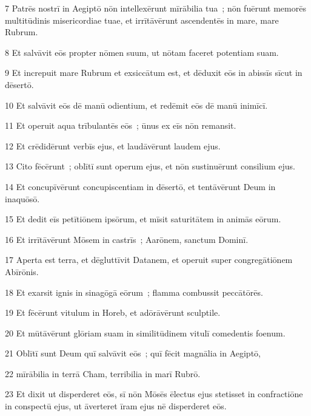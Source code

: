 \psalmVerse
  {\phantom{00}7}
  {Patrēs nostrī in Aegiptō nōn intellexērunt mīrābilia tua~; nōn fuērunt memorēs multitūdinis misericordiae tuae, et irrītāvērunt ascendentēs in mare, mare Rubrum.}


\psalmVerse
  {\phantom{00}8}
  {Et salvāvit eōs propter nōmen suum, ut nōtam faceret potentiam suam.}


\psalmVerse
  {\phantom{00}9}
  {Et increpuit mare Rubrum et exsiccātum est, et dēduxit eōs in abissīs sīcut in dēsertō.}


\psalmVerse
  {\phantom{0}10}
  {Et salvāvit eōs dē manū odientium, et redēmit eōs dē manū inimīcī.}


\psalmVerse
  {\phantom{0}11}
  {Et operuit aqua trībulantēs eōs~; ūnus ex eīs nōn remansit.}


\psalmVerse
  {\phantom{0}12}
  {Et crēdidērunt verbīs ejus, et laudāvērunt laudem ejus.}


\psalmVerse
  {\phantom{0}13}
  {Cito fēcērunt~; oblītī sunt operum ejus, et nōn sustinuērunt consilium ejus.}


\psalmVerse
  {\phantom{0}14}
  {Et concupīvērunt concupiscentiam in dēsertō, et tentāvērunt Deum in inaquōsō.}


\psalmVerse
  {\phantom{0}15}
  {Et dedit eīs petītiōnem ipsōrum, et mīsit saturitātem in animās eōrum.}


\psalmVerse
  {\phantom{0}16}
  {Et irrītāvērunt Mōsem in castrīs~; Aarōnem, sanctum Dominī.}


\psalmVerse
  {\phantom{0}17}
  {Aperta est terra, et dēgluttīvit Datanem, et operuit super congregātiōnem Abīrōnis.}


\psalmVerse
  {\phantom{0}18}
  {Et exarsit ignis in sinagōgā eōrum~; flamma combussit peccātōrēs.}


\psalmVerse
  {\phantom{0}19}
  {Et fēcērunt vitulum in Horeb, et adōrāvērunt sculptile.}


\psalmVerse
  {\phantom{0}20}
  {Et mūtāvērunt glōriam suam in similitūdinem vitulī comedentis foenum.}


\psalmVerse
  {\phantom{0}21}
  {Oblītī sunt Deum quī salvāvit eōs~; quī fēcit magnālia in Aegiptō,}


\psalmVerse
  {\phantom{0}22}
  {mīrābilia in terrā Cham, terribilia in marī Rubrō.}


\psalmVerse
  {\phantom{0}23}
  {Et dixit ut disperderet eōs, sī nōn Mōsēs ēlectus ejus stetisset in confractiōne in conspectū ejus, ut āverteret īram ejus nē disperderet eōs.}


